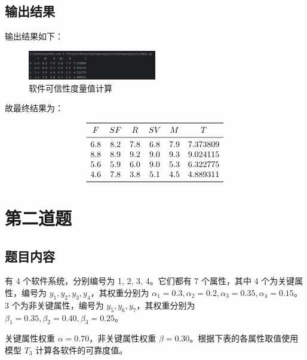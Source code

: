 \subsection{输出结果}

输出结果如下：

\begin{figure} [H]
    \centering
    \includegraphics[width=0.5\textwidth]{img5/result.png}
    \caption{软件可信性度量值计算}
    \label{fig:result}
\end{figure}

故最终结果为：

\[
\begin{array}{cccccc}
\toprule
F & SF & R & SV & M & T \\
\midrule
6.8 & 8.2 & 7.8 & 6.8 & 7.9 & 7.373809 \\
8.8 & 8.9 & 9.2 & 9.0 & 9.3 & 9.024115 \\
5.6 & 5.9 & 6.0 & 9.0 & 5.3 & 6.322775 \\
4.6 & 7.8 & 3.8 & 5.1 & 4.5 & 4.889311 \\
\bottomrule
\end{array}
\]

\section{第二道题}

\subsection{题目内容}

有 4 个软件系统，分别编号为 1, 2, 3, 4。它们都有 7 个属性，其中 4 个为关键属性，编号为 $y_1, y_2, y_3, y_4$，其权重分别为 $\alpha_1 = 0.3, \alpha_2 = 0.2, \alpha_3 = 0.35, \alpha_4 = 0.15$。
3 个为非关键属性，编号为 $y_5, y_6, y_7$，其权重分别为 $\beta_1 = 0.35, \beta_2 = 0.40, \beta_3 = 0.25$。

关键属性权重 $\alpha = 0.70$，非关键属性权重 $\beta = 0.30$。根据下表的各属性取值使用模型 $T_3$ 计算各软件的可靠度值。


